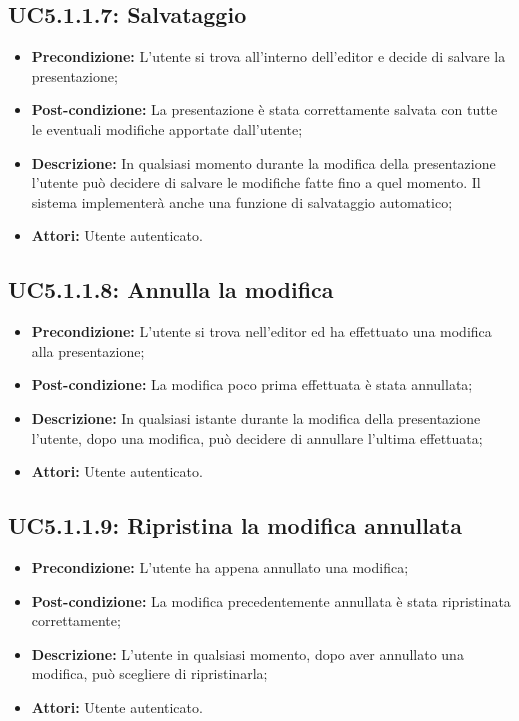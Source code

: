 \subsection{ UC5.1.1.7: Salvataggio}

\begin{itemize}
	\item \textbf{Precondizione:} L’utente si trova all’interno dell’editor e decide di salvare la presentazione;
	\item \textbf{Post-condizione:} La presentazione è stata correttamente salvata con tutte le eventuali modifiche apportate dall’utente;
	\item \textbf{Descrizione:} In qualsiasi momento durante la modifica della presentazione l’utente può decidere di salvare le modifiche fatte fino a quel momento. Il sistema implementerà anche una funzione di salvataggio automatico;
	\item \textbf{Attori:} Utente autenticato.
\end{itemize}
\subsection{ UC5.1.1.8: Annulla la modifica}

\begin{itemize}
	\item \textbf{Precondizione:} L’utente si trova nell’editor ed ha effettuato una modifica alla presentazione;
	\item \textbf{Post-condizione:} La modifica poco prima effettuata è stata annullata;
	\item \textbf{Descrizione:} In qualsiasi istante durante la modifica della presentazione l’utente, dopo una modifica, può decidere di annullare l’ultima effettuata;
	\item \textbf{Attori:} Utente autenticato.
\end{itemize}
\subsection{ UC5.1.1.9: Ripristina la modifica annullata}

\begin{itemize}
	\item \textbf{Precondizione:} L’utente ha appena annullato una modifica;
	\item \textbf{Post-condizione:} La modifica precedentemente annullata è stata ripristinata correttamente;
	\item \textbf{Descrizione:} L’utente in qualsiasi momento, dopo aver annullato una modifica, può scegliere di ripristinarla;
	\item \textbf{Attori:} Utente autenticato.
\end{itemize}
